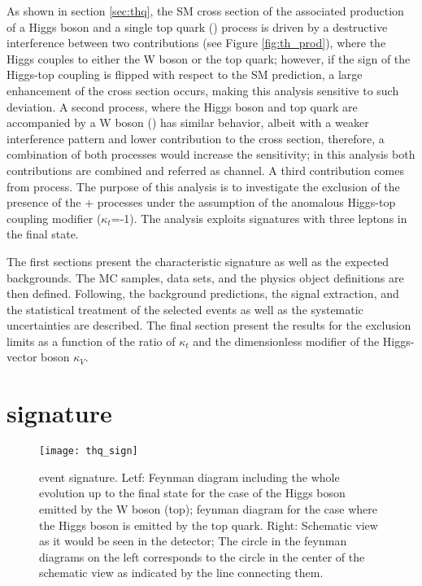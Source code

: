 As shown in section \ref{sec:thq}, the SM cross section of the associated production of a Higgs boson and a single top quark (\tHq) process is driven by a destructive interference between two contributions (see Figure \ref{fig:th_prod}), where the Higgs couples to either the W boson or the top quark; however, if the sign of the Higgs-top coupling is flipped with respect to the SM prediction, a large enhancement of the cross section occurs, making this analysis sensitive to such deviation. A second process, where the Higgs boson and top quark are accompanied by a W boson (\tHW) has similar behavior, albeit with a weaker interference pattern and lower contribution to the \tH cross section, therefore, a combination of both processes would increase the sensitivity; in this analysis both contributions are combined and referred as  \tH channel. A third contribution comes from \ttH process. The purpose of this analysis is to investigate the exclusion of the presence of the \tH + \ttH processes under the assumption of the anomalous Higgs-top coupling modifier ($\kappa_t$=-1). The analysis exploits signatures with three leptons in the final state.

The first sections present the characteristic \tHq signature as well as the expected backgrounds. The MC samples, data sets, and the physics object definitions are then defined. Following, the background predictions, the signal extraction, and the statistical treatment of the selected events as well as the systematic uncertainties are described. The final section present the results for the exclusion limits as a function of the ratio of $\kappa_t$  and the dimensionless modifier of the Higgs-vector boson $\kappa_V$.  

\section{\tHq signature}\label{sec:thw_sign}

\begin{figure}[!htb]
\begin{center}
\texttt{[image: thq\_sign]}
\end{center}
\caption[\tHq event signature]{\tHq event signature. Letf: Feynman diagram including the whole evolution up to the final state for the case of the Higgs boson emitted by the W boson (top); feynman diagram for the case where the Higgs boson is emitted by the top quark. Right: Schematic view as it would be seen in the detector; The circle in the feynman diagrams on the left corresponds to the circle in the center of the schematic view as indicated by the line connecting them.}
\label{fig:thq_sign}
\end{figure}

